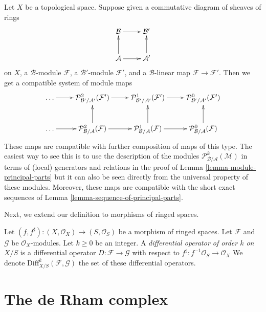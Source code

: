 \begin{remark}
\label{remark-functoriality-principal-parts}
Let $X$ be a topological space. Suppose given a commutative diagram of
sheaves of rings
$$
\xymatrix{
\mathcal{B} \ar[r] & \mathcal{B}' \\
\mathcal{A} \ar[u] \ar[r] & \mathcal{A}' \ar[u]
}
$$
on $X$, a $\mathcal{B}$-module $\mathcal{F}$,
a $\mathcal{B}'$-module $\mathcal{F}'$, and
a $\mathcal{B}$-linear map $\mathcal{F} \to \mathcal{F}'$.
Then we get a compatible system of module maps
$$
\xymatrix{
\ldots \ar[r] &
\mathcal{P}^2_{\mathcal{B}'/\mathcal{A}'}(\mathcal{F}') \ar[r] &
\mathcal{P}^1_{\mathcal{B}'/\mathcal{A}'}(\mathcal{F}') \ar[r] &
\mathcal{P}^0_{\mathcal{B}'/\mathcal{A}'}(\mathcal{F}') \\
\ldots \ar[r] &
\mathcal{P}^2_{\mathcal{B}/\mathcal{A}}(\mathcal{F}) \ar[r] \ar[u] &
\mathcal{P}^1_{\mathcal{B}/\mathcal{A}}(\mathcal{F}) \ar[r] \ar[u] &
\mathcal{P}^0_{\mathcal{B}/\mathcal{A}}(\mathcal{F}) \ar[u]
}
$$
These maps are compatible with further composition of maps of this type.
The easiest way to see this is to use the description of the modules
$\mathcal{P}^k_{\mathcal{B}/\mathcal{A}}(\mathcal{M})$ in terms of
(local) generators and relations in the proof of
Lemma \ref{lemma-module-principal-parts} but it can also be seen
directly from the universal
property of these modules. Moreover, these maps are compatible with
the short exact sequences of Lemma \ref{lemma-sequence-of-principal-parts}.
\end{remark}

\noindent
Next, we extend our definition to morphisms of ringed spaces.

\begin{definition}
\label{definition-relative-differential-operators}
Let $(f, f^\sharp) : (X, \mathcal{O}_X) \to (S, \mathcal{O}_S)$
be a morphism of ringed spaces.
Let $\mathcal{F}$ and $\mathcal{G}$ be $\mathcal{O}_X$-modules.
Let $k \geq 0$ be an integer.
A {\it differential operator of order $k$ on $X/S$}
is a differential operator $D : \mathcal{F} \to \mathcal{G}$
with respect to $f^\sharp : f^{-1}\mathcal{O}_S \to \mathcal{O}_X$
We denote $\text{Diff}^k_{X/S}(\mathcal{F}, \mathcal{G})$
the set of these differential operators.
\end{definition}












\section{The de Rham complex}
\label{section-de-rham-complex}

